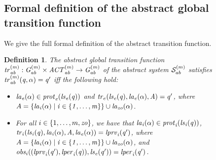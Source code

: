 \documentclass{article}
\newtheorem{definition}{Definition}
\begin{document}
\subsection*{Formal definition of the abstract global transition function} 
We give the full formal definition of the abstract transition function.
\begin{definition}
  The {\em abstract global transition function} $\it{tr}^{(m)}_{ab} : G^{(m)}_{ab}
  \times \mathit{ACT}^{(m)}_{ab} \rightarrow G^{(m)}_{ab}$ of the abstract 
  system $\mathcal{S}^{(m)}_{ab}$ satisfies $\it{tr}^{(m)}_{ab}(q, \alpha) = q'$ iff the
  following hold:
  \begin{itemize}
    \item $\it{la}_{e}({\alpha}) \in \mathit{prot}_{e}({\it{ls}_{e}(q)})$ and $\mathit{tr}_{e}(\it{ls}_{e}(q),
    \it{la}_{e}({\alpha}), A) = q'$, where
    $A = \left \{ \it{la}_{i}({\alpha}) \mid i \in \left \{ 1,\ldots,m \right \} \right \} \cup
\it{la}_{zo}({\alpha})$.
    \item For all $i \in \left \{ 1,\ldots,m, \it{zo} \right \}$, we have that
    $\it{la}_{i}({\alpha}) \in \mathit{prot}_{i}(\it{ls}_{i}(q))$, $\mathit{tr}_{i} (\it{ls}_{i}(q), \it{la}_{i}({\alpha}),
    A, \it{la}_{e}({\alpha})) = \it{lprv}_{i}(q')$, where  $A = \left \{ \it{la}_{i}({\alpha}) \mid i \in
    \left \{ 1,\ldots,m \right \} \right \} \cup \it{la}_{zo}({\alpha})$, and $\mathit{obs}_{i}((\it{lprv}_{i}(q'),\it{lper}_{i}(q)),\it{ls}_{e}(q')) = \it{lper}_{i}(q')$.
  \end{itemize}
\end{definition}
\end{document}
